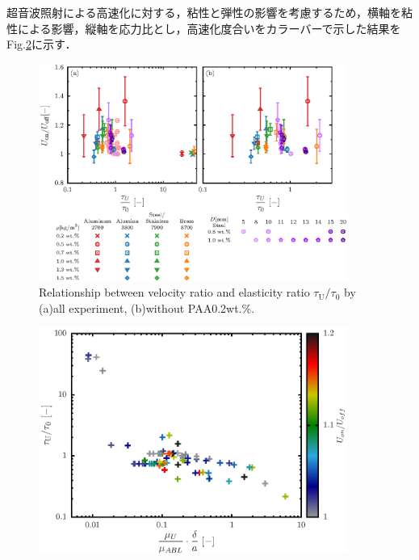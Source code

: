 超音波照射による高速化に対する，粘性と弾性の影響を考慮するため，横軸を粘性による影響，縦軸を応力比とし，高速化度合いをカラーバーで示した結果をFig.\ref{fig:elastcityColor}に示す．

\begin{figure}[h]
    \centering
    \includegraphics[width=0.9\textwidth]{5-Results/elastcity.eps}
    \caption{Relationship between velocity ratio and elasticity ratio $\tau_\text{U}/\tau_\text{0}$ by (a)all experiment, (b)without PAA0.2wt.\%.}
    \label{fig:elastcity}
\end{figure}

\begin{figure}[h]
    \centering
    \includegraphics[width=0.9\textwidth]{5-Results/elastcity_color.eps}
    \caption{}
    \label{fig:elastcityColor}
\end{figure}
